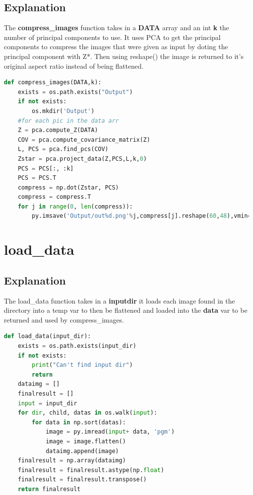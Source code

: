 \documentclass{article}
\begin{document}
\subsection{Explanation}
The \textbf{compress\_images} function takes in a \textbf{DATA} array and an int \textbf{k} the number of principal components to use. It uses PCA to get the principal components to compress the images that were given as input by doting the principal component with Z*. Then using reshape() the image is returned to it's original aspect ratio instead of being flattened.
\begin{lstlisting}[language=Python]
def compress_images(DATA,k):
    exists = os.path.exists("Output")
    if not exists:
        os.mkdir('Output')
    #for each pic in the data arr
    Z = pca.compute_Z(DATA)
    COV = pca.compute_covariance_matrix(Z)
    L, PCS = pca.find_pcs(COV)
    Zstar = pca.project_data(Z,PCS,L,k,0)
    PCS = PCS[:, :k]
    PCS = PCS.T
    compress = np.dot(Zstar, PCS)
    compress = compress.T
    for j in range(0, len(compress)):
        py.imsave('Output/out%d.png'%j,compress[j].reshape(60,48),vmin=0,vmax=255,cmap='gray',format='png')
\end{lstlisting}

\section{load\_data}
\subsection{Explanation}
The load\_data function takes in a \textbf{inputdir} it loads each image found in the directory into a temp var to then be flattened and loaded into the \textbf{data} var to be returned and used by compress\_images.

\begin{lstlisting}[language=Python]
def load_data(input_dir):
    exists = os.path.exists(input_dir)
    if not exists:
        print("Can't find input dir")
        return
    dataimg = []
    finalresult = []
    input = input_dir
    for dir, child, datas in os.walk(input):
        for data in np.sort(datas):
            image = py.imread(input+ data, 'pgm')
            image = image.flatten()
            dataimg.append(image)
    finalresult = np.array(dataimg)
    finalresult = finalresult.astype(np.float)
    finalresult = finalresult.transpose()
    return finalresult
\end{lstlisting}
\end{document}
